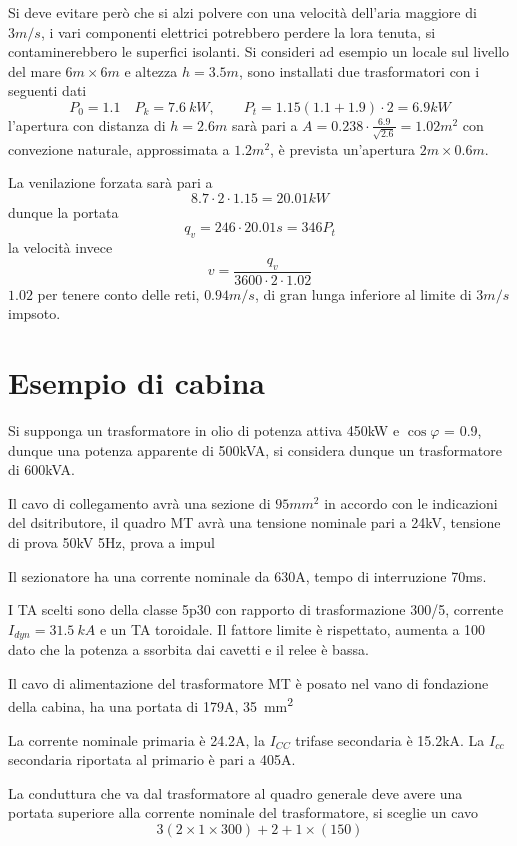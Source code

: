 Si deve evitare però che si alzi polvere con una velocità dell'aria maggiore di $3m/s$, i vari componenti elettrici potrebbero perdere la lora tenuta, si contaminerebbero le superfici isolanti.
Si consideri ad esempio un locale sul livello del mare $6m\times 6m$ e altezza $h=3.5m$, sono installati due trasformatori con i seguenti dati 
$$
P_0 = 1.1\quad P_k = 7.6\ kW,\qquad P_t = 1.15(1.1+1.9)\cdot 2 = 6.9 kW
$$
l'apertura con distanza di $h=2.6m$ sarà pari a $A = 0.238\cdot\frac{6.9}{\sqrt{2.6}}= 1.02m^2$ con convezione naturale, approssimata a $1.2m^2$, è prevista un'apertura $2m\times 0.6m$.

La venilazione forzata sarà pari a $$
8.7\cdot 2\cdot 1.15 =  20.01 kW
$$
dunque la portata
$$
q_v = 246\cdot 20.01s = 346 P_t
$$
la velocità invece
$$
v = \frac{q_v}{3600\cdot 2\cdot 1.02}
$$
$1.02$ per tenere conto delle reti, $0.94m/s$, di gran lunga inferiore al limite di $3m/s$ impsoto.

\section{Esempio di cabina}
Si supponga un trasformatore in olio di potenza attiva 450kW e $\cos\varphi$ = 
0.9, dunque una potenza apparente di 500kVA, si considera dunque un 
trasformatore di 600kVA.

Il cavo di collegamento avrà una sezione di $95 mm^2$ in accordo con le indicazioni del dsitributore, il quadro MT avrà una tensione nominale pari a 24kV, tensione di prova 50kV 5Hz, prova a impul



Il sezionatore ha una corrente nominale da 630A, tempo di interruzione 70ms.

I TA scelti sono della classe 5p30 con rapporto di trasformazione 300/5, corrente $I_{dyn} = 31.5\ kA$ e un TA toroidale.
Il fattore limite è rispettato, aumenta a 100 dato che la potenza a  ssorbita dai cavetti e il relee è bassa.

Il cavo di alimentazione del trasformatore MT è posato nel vano di fondazione della cabina, ha una portata di 179A, \SI{35}{\milli\meter^2}

La corrente nominale primaria è 24.2A, la $I_{CC}$ trifase secondaria è 15.2kA.
La $I_{cc}$ secondaria riportata al primario è pari a 405A.

La conduttura che va dal trasformatore al quadro generale deve avere una portata superiore alla corrente nominale del trasformatore, si sceglie un cavo
$$
3(2\times 1\times 300) + 2 + 1\times(150)
$$

